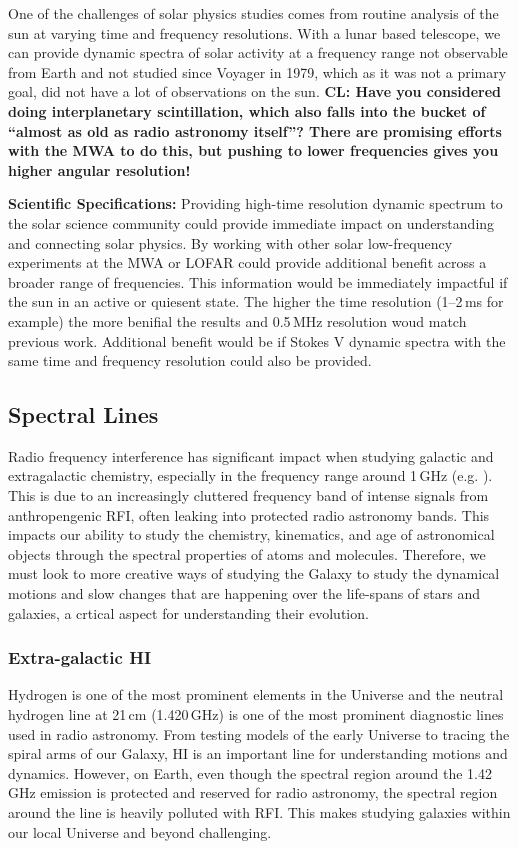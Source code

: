 One of the challenges of solar physics studies comes from routine analysis of the sun at varying time and frequency resolutions. With a lunar based telescope, we can provide dynamic spectra of solar activity at a frequency range not observable from Earth and not studied since Voyager in 1979, which as it was not a primary goal, did not have a lot of observations on the sun.
\textbf{CL: Have you considered doing interplanetary scintillation, which also falls into the bucket of ``almost as old as radio astronomy itself''? There are promising efforts with the MWA to do this, but pushing to lower frequencies gives you higher angular resolution!}

\textbf{Scientific Specifications:} Providing high-time resolution dynamic spectrum to the solar science community could provide immediate impact on understanding and connecting solar physics. By working with other solar low-frequency experiments at the MWA or LOFAR could provide additional benefit across a broader range of frequencies. This information would be immediately impactful if the sun in an active or quiesent state. The higher the time resolution (1--2\,ms for example) the more benifial the results and 0.5\,MHz resolution woud match previous work. Additional benefit would be if Stokes V dynamic spectra with the same time and frequency resolution could also be provided.

\subsection{Spectral Lines}
Radio frequency interference has significant impact when studying galactic and extragalactic chemistry, especially in the frequency range around 1\,GHz (e.g. \citealt{Liang_2023}). This is due to an increasingly cluttered frequency band of intense signals from anthropengenic RFI, often leaking into protected radio astronomy bands. This impacts our ability to study the chemistry, kinematics, and age of astronomical objects through the spectral properties of atoms and molecules. Therefore, we must look to more creative ways of studying the Galaxy to study the dynamical motions and slow changes that are happening over the life-spans of stars and galaxies, a crtical aspect for understanding their evolution.

\subsubsection{Extra-galactic HI}
Hydrogen is one of the most prominent elements in the Universe and the neutral hydrogen line at 21\,cm (1.420\,GHz) is one of the most prominent diagnostic lines used in radio astronomy. From testing models of the early Universe to tracing the spiral arms of our Galaxy, H{\sc I} is an important line for understanding motions and dynamics. However, on Earth, even though the spectral region around the 1.42\,GHz emission is protected and reserved for radio astronomy, the spectral region around the line is heavily polluted with RFI. This makes studying galaxies within our local Universe and beyond challenging. 

